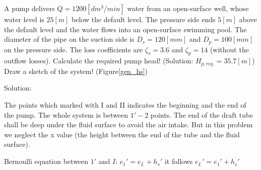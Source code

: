 \vspace{1cm}
\begin{tcolorbox}

A pump delivers $Q=1200[dm^3/min]$ water from an open-surface well, whose water level is $25[m]$ below the default level. The pressure side ends $5[m]$ above the default level and the water flows into an open-surface swimming pool. The diameter of the pipe on the suction side is $D_s=120[mm]$ and $D_p=100[mm]$ on the pressure side. The loss coefficients are $\zeta_s=3.6$ and $\zeta_p=14$ (without the outflow losses). Calculate the required pump head! (Solution: $H_{p,req.}=35.7[m]$) Draw a sketch of the system! (Figure\ref{gen_hs})
\vspace{0.2cm}

Solution:
\vspace{0.2cm}

The points which marked with I and II indicates the beginning and the end of the pump. The whole system is between $1' - 2$ points. The end of the draft tube shall be deep under the fluid surface to avoid the air intake. But in this problem we neglect the x value (the height between the end of the tube and the fluid surface).

Bernoulli equation between $1'$ and $I$: ${e_1}'=e_{I.}+{h_s}'$ it follows ${e_{I.}}'=e_{1}'+{h_s}'$


\end{tcolorbox}
